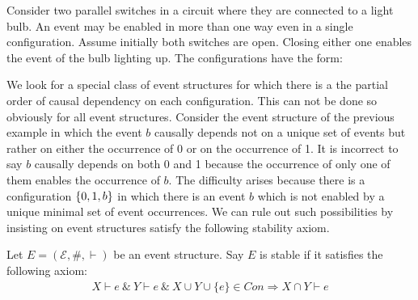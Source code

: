 \begin{example}
    Consider two parallel switches in a circuit where they are connected
    to a light bulb.
    An event may be enabled in more than one way even in a single configuration.
    Assume initially both switches are open.
    Closing either one enables the event of the bulb lighting up.
    The configurations have the form:

    \begin{center}
    \end{center}
\end{example}

We look for a special class of event structures for which there is a
the partial order of causal dependency on each configuration.
This can not be done so obviously for all event structures.
Consider the event structure of the previous example in which
the event $b$ causally depends not on a unique set of events
but rather on either the occurrence of 0 or on the occurrence of 1.
It is incorrect to say $b$ causally depends on both 0 and 1 because
the occurrence of only one of them enables the occurrence of $b$.
The difficulty arises because there is a configuration $\{0,1,b\}$
in which there is an event $b$ which is not enabled by a unique minimal
set of event occurrences.
We can rule out such possibilities by insisting on event structures
satisfy the following stability axiom.

\begin{definition}
    Let $E = (\mathcal{E},\#,\vdash)$ be an event structure. Say $E$ is stable if it satisfies the following axiom:
    \begin{align*}
        X \vdash e \ \& \ Y \vdash e \ \& \ X \cup Y \cup \{e\} \in Con \Rightarrow X \cap Y \vdash e
    \end{align*}
\end{definition}

